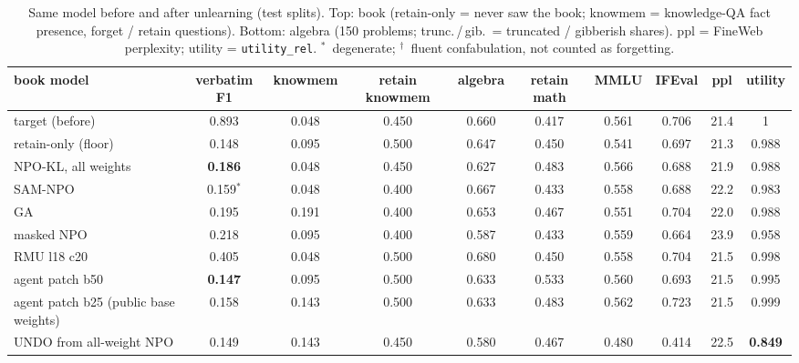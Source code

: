 \documentclass[10pt,twocolumn,letterpaper]{article}
\newcommand{\dg}{$^\ast$}
\newcommand{\cf}{$^\dagger$}
\begin{document}
\begin{table}[t]
\centering\footnotesize
\caption{Same model before and after unlearning (test splits). Top: book (retain-only = never saw the book; knowmem =
knowledge-QA fact presence, forget / retain questions). Bottom: algebra (150 problems; trunc.\,/\,gib.\ = truncated /
gibberish shares). ppl = FineWeb perplexity; utility = \texttt{utility\_rel}. \dg\ degenerate; \cf\ fluent confabulation,
not counted as forgetting.}
\label{tab:direct}
\begin{tabular}{@{}lccccccccc@{}}
\toprule
book model & verbatim F1 & knowmem & retain knowmem & algebra & retain math & MMLU & IFEval & ppl & utility \\
\midrule
target (before) & 0.893 & 0.048 & 0.450 & 0.660 & 0.417 & 0.561 & 0.706 & 21.4 & 1 \\
retain-only (floor) & 0.148 & 0.095 & 0.500 & 0.647 & 0.450 & 0.541 & 0.697 & 21.3 & 0.988 \\
\midrule
NPO-KL, all weights & \textbf{0.186} & 0.048 & 0.450 & 0.627 & 0.483 & 0.566 & 0.688 & 21.9 & 0.988 \\
SAM-NPO & 0.159\dg & 0.048 & 0.400 & 0.667 & 0.433 & 0.558 & 0.688 & 22.2 & 0.983 \\
GA & 0.195 & 0.191 & 0.400 & 0.653 & 0.467 & 0.551 & 0.704 & 22.0 & 0.988 \\
masked NPO & 0.218 & 0.095 & 0.400 & 0.587 & 0.433 & 0.559 & 0.664 & 23.9 & 0.958 \\
RMU l18 c20 & 0.405 & 0.048 & 0.500 & 0.680 & 0.450 & 0.558 & 0.704 & 21.5 & 0.998 \\
agent patch b50 & \textbf{0.147} & 0.095 & 0.500 & 0.633 & 0.533 & 0.560 & 0.693 & 21.5 & 0.995 \\
agent patch b25 (public base weights) & 0.158 & 0.143 & 0.500 & 0.633 & 0.483 & 0.562 & 0.723 & 21.5 & 0.999 \\
UNDO from all-weight NPO & 0.149 & 0.143 & 0.450 & 0.580 & 0.467 & 0.480 & 0.414 & 22.5 & \textbf{0.849} \\
\bottomrule
\end{tabular}


\end{table}
\end{document}
